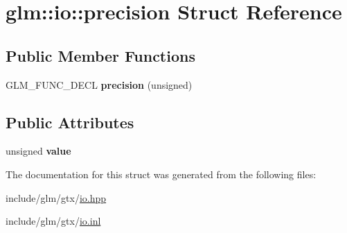 \hypertarget{structglm_1_1io_1_1precision}{}\section{glm\+:\+:io\+:\+:precision Struct Reference}
\label{structglm_1_1io_1_1precision}
\subsection*{Public Member Functions}
\begin{DoxyCompactItemize}
\item 
\mbox{\label{structglm_1_1io_1_1precision_aa359e1766fd74b88e049d5449d521447}} 
G\+L\+M\+\_\+\+F\+U\+N\+C\+\_\+\+D\+E\+CL {\bfseries precision} (unsigned)
\end{DoxyCompactItemize}
\subsection*{Public Attributes}
\begin{DoxyCompactItemize}
\item 
\mbox{\label{structglm_1_1io_1_1precision_a43da772dff9a209768c63f1220d52074}} 
unsigned {\bfseries value}
\end{DoxyCompactItemize}


The documentation for this struct was generated from the following files\+:\begin{DoxyCompactItemize}
\item 
include/glm/gtx/\hyperlink{io_8hpp}{io.\+hpp}\item 
include/glm/gtx/\hyperlink{io_8inl}{io.\+inl}\end{DoxyCompactItemize}
